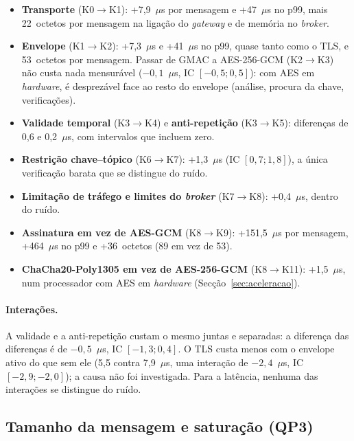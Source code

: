 \begin{itemize}[leftmargin=*]
  \item \textbf{Transporte} (K0$\to$K1): +7,9~$\mu$s por mensagem e +47~$\mu$s
    no p99, mais 22~octetos por mensagem na ligação do \emph{gateway} e  de
    memória no \emph{broker}.
  \item \textbf{Envelope} (K1$\to$K2): +7,3~$\mu$s e +41~$\mu$s no p99, quase
    tanto como o TLS, e 53~octetos por mensagem. Passar de GMAC a AES-256-GCM
    (K2$\to$K3) não custa nada mensurável ($-0{,}1$~$\mu$s, IC $[-0{,}5; 0{,}5]$):
    com AES em \emph{hardware},  é desprezável face ao resto do
    envelope (análise, procura da chave, verificações).
  \item \textbf{Validade temporal} (K3$\to$K4) e \textbf{anti-repetição}
    (K3$\to$K5): diferenças de 0,6 e 0,2~$\mu$s, com intervalos que incluem zero.
  \item \textbf{Restrição chave--tópico} (K6$\to$K7): +1,3~$\mu$s
    (IC $[0{,}7; 1{,}8]$), a única verificação barata que se distingue do ruído.
  \item \textbf{Limitação de tráfego e limites do \emph{broker}} (K7$\to$K8):
    +0,4~$\mu$s, dentro do ruído.
  \item \textbf{Assinatura em vez de AES-GCM} (K8$\to$K9): +151,5~$\mu$s por
    mensagem, +464~$\mu$s no p99 e +36~octetos (89 em vez de 53).
  \item \textbf{ChaCha20-Poly1305 em vez de AES-256-GCM} (K8$\to$K11): +1,5~$\mu$s,
    num processador com AES em \emph{hardware} (Secção~\ref{sec:aceleracao}).
\end{itemize}

\paragraph{Interações.} A validade e a anti-repetição custam o mesmo juntas e
separadas: a diferença das diferenças  é de $-0{,}5$~$\mu$s, IC $[-1{,}3; 0{,}4]$.
O TLS custa menos com o envelope ativo do que sem ele (5,5 contra 7,9~$\mu$s, uma
interação de $-2{,}4$~$\mu$s, IC $[-2{,}9; -2{,}0]$); a causa não foi
investigada. Para a latência, nenhuma das interações se distingue do ruído.

\subsection{Tamanho da mensagem e saturação (QP3)}
\label{sec:saturacao}

